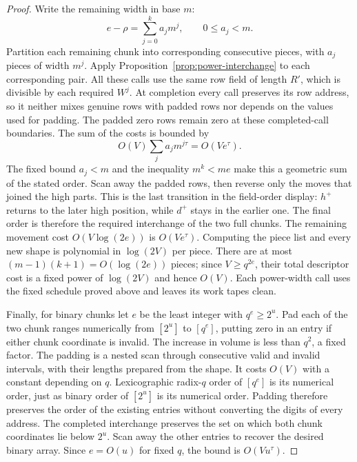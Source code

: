 \documentclass[11pt]{article}
\theoremstyle{definition}
\begin{document}
\begin{proof}
Write the remaining width in base $m$:
\[
 e-\rho=\sum_{j=0}^{k} a_jm^j,\qquad 0\le a_j<m.
\]
Partition each remaining chunk into corresponding consecutive pieces,
with $a_j$ pieces of width $m^j$.  Apply
Proposition~\ref{prop:power-interchange} to each corresponding pair.
All these calls use the same row field of length $R'$, which is divisible
by each required $W^j$.  At completion every call preserves its row
address, so it neither mixes genuine rows with padded rows nor depends
on the values used for padding.  The padded zero rows remain zero at
these completed-call boundaries.  The sum of the costs is bounded by
\[
 O(V)\sum_j a_jm^{j\tau}=O(Ve^\tau).
\]
The fixed bound $a_j<m$ and the inequality $m^k<me$ make this a
geometric sum of the stated order.  Scan away the padded rows, then
reverse only the moves that joined the high parts.  This is the last
transition in the field-order display: $h^+$ returns to the later
high position, while $d^+$ stays in the earlier one.  The final order
is therefore the required interchange of the two full chunks.  The
remaining movement cost $O(V\log(2e))$ is $O(Ve^\tau)$.
Computing the piece list and every new shape is polynomial in
$\log(2V)$ per piece.  There are at most
$(m-1)(k+1)=O(\log(2e))$ pieces; since $V\ge q^{2e}$, their total
descriptor cost is a fixed power of $\log(2V)$ and hence $O(V)$.
Each power-width call uses the fixed schedule proved above and leaves
its work tapes clean.

Finally, for binary chunks let $e$ be the least integer with
$q^e\ge2^u$.  Pad each of the two chunk ranges numerically from $[2^u]$
to $[q^e]$, putting zero in an entry if either chunk coordinate is
invalid.  The increase in volume is less than $q^2$, a fixed factor.
The padding is a nested scan through consecutive valid and invalid
intervals, with their lengths prepared from the shape.  It costs $O(V)$
with a constant depending on $q$.  Lexicographic radix-$q$ order of
$[q^e]$ is its numerical order, just as binary order of $[2^u]$ is its
numerical order.  Padding therefore preserves the order of the existing
entries without converting the digits of every address.
The completed interchange preserves the set on which both chunk
coordinates lie below $2^u$.  Scan away the other entries to recover the
desired binary array.  Since $e=O(u)$ for fixed $q$, the bound is
$O(Vu^\tau)$.
\end{proof}
\end{document}
